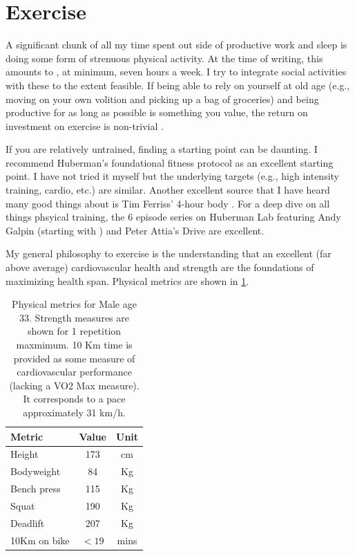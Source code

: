 \documentclass[10pt,twocolumn]{extarticle}
\begin{document}
\section{Exercise}
A significant chunk of all my time spent out side of productive work and sleep is doing some form of strenuous physical activity. At the time of writing, this amounts to , at minimum, seven hours a week. I try to integrate social activities with these to the extent feasible. If being able to rely on yourself at old age (e.g., moving on your own volition and picking up a bag of groceries) and being productive for as long as possible is something you value, the return on investment on exercise is non-trivial \cite{attia2024exercise}. 

If you are relatively untrained, finding a starting point can be daunting. I recommend Huberman's foundational fitness protocol \cite{huberman2023foundational} as an excellent starting point. I have not tried it myself but the underlying targets (e.g., high intensity training, cardio, etc.) are similar. Another excellent source that I have heard many good things about is Tim Ferriss' 4-hour body \cite{four_hour_body}. For a deep dive on all things phsyical training, the 6 episode series on Huberman Lab featuring Andy Galpin (starting with \cite{huberman2023galpin}) and Peter Attia's Drive \cite{attia2022joyner,attia2023centenarian,attia2024exercise} are excellent.

My general philosophy to exercise is the understanding that an excellent (far above average) cardiovascular health and strength are the foundations of maximizing health span. Physical metrics are shown in \ref{tab:metrics}.

\begin{table}[h!]
    \centering
    \begin{tabular}{lcc}
        \toprule
        \textbf{Metric} & \textbf{Value} & \textbf{Unit} \\
        \midrule
        Height & 173 & cm \\
        Bodyweight & 84 & Kg\\
        Bench press & 115 & Kg \\
        Squat  & 190  & Kg\\
        Deadlift& 207 & Kg \\
        10Km on bike & $<19$ & mins\\
        \bottomrule
    \end{tabular}
    \caption{Physical metrics for Male age 33. Strength measures are shown for 1 repetition maxmimum. 10 Km time is provided as some measure of cardiovascular performance (lacking a VO2 Max measure). It corresponds to a pace approximately 31 km/h.}
    \label{tab:metrics}
\end{table}
\end{document}
